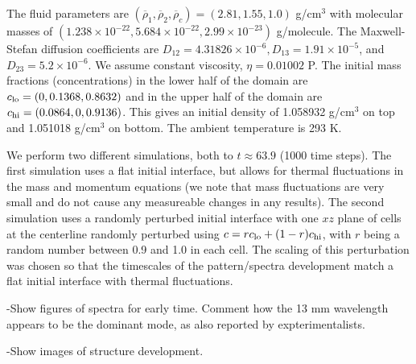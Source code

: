 \documentclass[final]{siamltex}
\begin{document}
The fluid parameters are $(\overline\rho_1, \overline\rho_2, \overline\rho_c) = (2.81, 1.55, 1.0)$ g/cm$^3$
with molecular masses of $(1.238\times 10^{-22}, 5.684\times 10^{-22}, 2.99\times 10^{-23})$ g/molecule.
The Maxwell-Stefan diffusion coefficients are
$D_{12} = 4.31826\times 10^{-6}, D_{13} = 1.91\times 10^{-5}$, and $D_{23} = 5.2\times 10^{-6}$.
We assume constant viscosity, $\eta = 0.01002$ P.  The initial mass fractions (concentrations) in the 
lower half of the domain are $c_{\rm lo} = (0, 0.1368, 0.8632)$ and in the upper half of the domain
are $c_{\rm hi} = (0.0864, 0, 0.9136)$.  This gives an initial density of 1.058932 g/cm$^3$ on top 
and 1.051018 g/cm$^3$ on bottom.  The ambient temperature is 293 K.

We perform two different simulations, both to $t\approx 63.9$ (1000 time steps).
The first simulation uses a flat initial interface, but allows for thermal fluctuations in the mass
and momentum equations (we note that mass fluctuations are very small and do not cause any measureable
changes in any results).  The second simulation uses a randomly perturbed initial interface with one $xz$ plane 
of cells at the centerline randomly perturbed using $c = r c_{\rm lo} + (1-r) c_{\rm hi}$, with $r$ being a 
random number between 0.9 and 1.0 in each cell.  The scaling of this perturbation was chosen
so that the timescales of the pattern/spectra development match a flat initial interface with thermal fluctuations.

-Show figures of spectra for early time.  Comment how the 13 mm wavelength appears to be the dominant mode,
 as also reported by expterimentalists.

-Show images of structure development.
\end{document}
